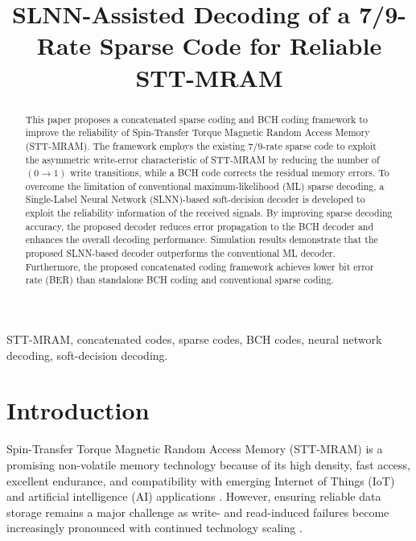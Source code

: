 \documentclass[conference]{IEEEtran}
\begin{document}
\title{SLNN-Assisted Decoding of a 7/9-Rate Sparse Code for Reliable STT-MRAM\\}

\author{


}

\maketitle

\begin{abstract}
This paper proposes a concatenated sparse coding and BCH coding framework to improve the reliability of Spin-Transfer Torque Magnetic Random Access Memory (STT-MRAM). The framework employs the existing 7/9-rate sparse code to exploit the asymmetric write-error characteristic of STT-MRAM by reducing the number of $(0 \rightarrow 1)$ write transitions, while a BCH code corrects the residual memory errors. To overcome the limitation of conventional maximum-likelihood (ML) sparse decoding, a Single-Label Neural Network (SLNN)-based soft-decision decoder is developed to exploit the reliability information of the received signals. By improving sparse decoding accuracy, the proposed decoder reduces error propagation to the BCH decoder and enhances the overall decoding performance. Simulation results demonstrate that the proposed SLNN-based decoder outperforms the conventional ML decoder. Furthermore, the proposed concatenated coding framework achieves lower bit error rate (BER) than standalone BCH coding and conventional sparse coding.
\end{abstract}


\begin{IEEEkeywords}
STT-MRAM, concatenated codes, sparse codes, BCH codes, neural network decoding, soft-decision decoding.
\end{IEEEkeywords}



\section{Introduction}
Spin-Transfer Torque Magnetic Random Access Memory (STT-MRAM) is a promising non-volatile memory technology because of its high density, fast access, excellent endurance, and compatibility with emerging Internet of Things (IoT) and artificial intelligence (AI) applications \cite{girard2020survey}. However, ensuring reliable data storage remains a major challenge as write- and read-induced failures become increasingly pronounced with continued technology scaling \cite{hemaram2025asymmetric}.
\end{document}
